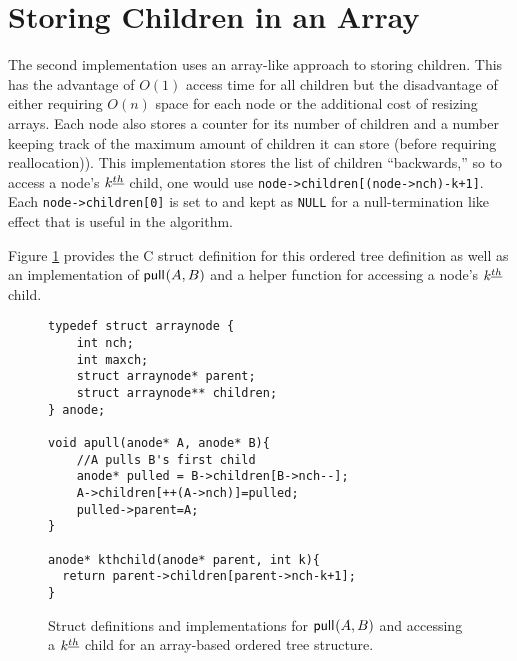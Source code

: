 \section{Storing Children in an Array}\label{sec:otree-arr}
The second implementation uses an array-like approach to storing children.  This has the advantage of $O(1)$ access time for all children but the disadvantage of either requiring $O(n)$ space for each node or the additional cost of resizing arrays.  Each node also stores a counter for its number of children and a number keeping track of the maximum amount of children it can store (before requiring reallocation)).  This implementation stores the list of children ``backwards,'' so to access a node's $k^{\underline{th}}$ child, one would use \verb_node->children[(node->nch)-k+1]_.  Each \verb+node->children[0]+ is set to and kept as \verb+NULL+ for a null-termination like effect that is useful in the algorithm.  

Figure \ref{fig:otreestarter-arr} provides the C struct definition for this ordered tree definition as well as an implementation of $\mathsf{pull}_{}(A,B)$ and a helper function for accessing a node's $k^{\underline{th}}$ child. 
    \begin{figure}
	\begin{center}

	    \begin{Verbatim}
typedef struct arraynode {
    int nch; 
    int maxch;
    struct arraynode* parent;
    struct arraynode** children;
} anode;

void apull(anode* A, anode* B){ 
    //A pulls B's first child
    anode* pulled = B->children[B->nch--];
    A->children[++(A->nch)]=pulled;
    pulled->parent=A;
}

anode* kthchild(anode* parent, int k){
  return parent->children[parent->nch-k+1];
}
	    \end{Verbatim}
	\end{center}

    \cprotect\caption{Struct definitions and implementations for $\mathsf{pull}_{}(A,B)$ and accessing a $k^{\underline{th}}$ child for an array-based ordered tree structure.}
    \label{fig:otreestarter-arr}
\end{figure}

